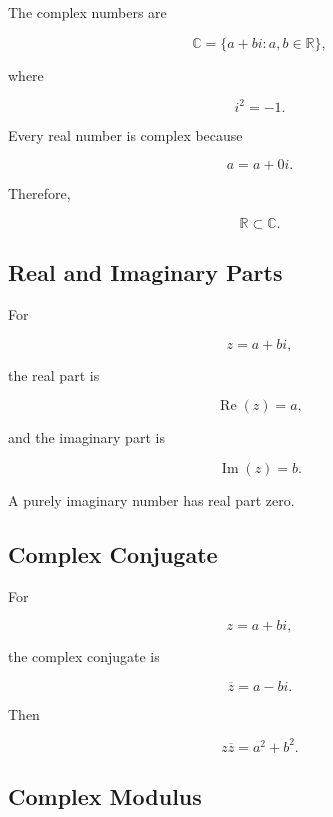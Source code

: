 The complex numbers are

\[
\boxed{
\mathbb{C}
=
\{
a+bi
:
a,b\in\mathbb{R}
\},
}
\]

where

\[
\boxed{
i^2=-1.
}
\]

Every real number is complex because

\[
\boxed{
a
=
a+0i.
}
\]

Therefore,

\[
\boxed{
\mathbb{R}
\subset
\mathbb{C}.
}
\]

\subsection{Real and Imaginary Parts}
\label{subsec:real-imaginary-parts-reference}

For

\[
z=a+bi,
\]

the real part is

\[
\boxed{
\operatorname{Re}(z)=a,
}
\]

and the imaginary part is

\[
\boxed{
\operatorname{Im}(z)=b.
}
\]

A purely imaginary number has real part zero.

\subsection{Complex Conjugate}
\label{subsec:complex-conjugate-number-systems}

For

\[
z=a+bi,
\]

the complex conjugate is

\[
\boxed{
\overline{z}
=
a-bi.
}
\]

Then

\[
\boxed{
z\overline{z}
=
a^2+b^2.
}
\]

\subsection{Complex Modulus}
\label{subsec:complex-modulus-reference}

